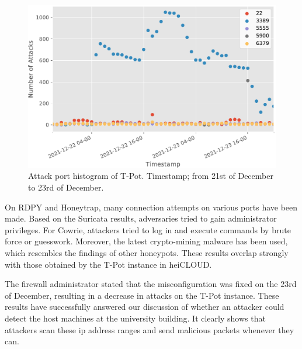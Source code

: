 \begin{figure}
    \centering
    \includegraphics[width=\textwidth]{figures/tpot-misconfig-port.pdf}
    \caption[Attack port histogram of T-Pot]{
        Attack port histogram of T-Pot.
        Timestamp; from 21st of December to 23rd of December.
    }
    \label{fig:tpot-misconfig-port-histogram}
\end{figure}

On RDPY and Honeytrap, many connection attempts on various ports have been made.
Based on the Suricata results, adversaries tried to gain administrator privileges.
For Cowrie, attackers tried to log in and execute commands by brute force or guesswork.
Moreover, the latest crypto-mining malware has been used, which resembles the findings of other honeypots.
These results overlap strongly with those obtained by the T-Pot instance in heiCLOUD.

The firewall administrator stated that the misconfiguration was fixed on the 23rd of December, resulting in a decrease in attacks on the T-Pot instance.
These results have successfully answered our discussion of whether an attacker could detect the host machines at the university building.
It clearly shows that attackers scan these \ac{ip} address ranges and send malicious packets whenever they can.

